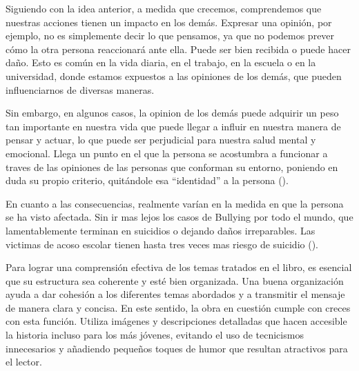 \documentclass[letterpaper, 12pt]{report}
\begin{document}
Siguiendo con la idea anterior, a medida que crecemos, comprendemos que
nuestras acciones tienen un impacto en los demás. Expresar una opinión,
por ejemplo, no es simplemente decir lo que pensamos, ya que no podemos
prever cómo la otra persona reaccionará ante ella. Puede ser bien recibida o
puede hacer daño. Esto es común en la vida diaria, en el trabajo, en la escuela
o en la universidad, donde estamos expuestos a las opiniones de los demás,
que pueden influenciarnos de diversas maneras.

Sin embargo, en algunos casos, la opinion de los demás puede adquirir un peso
tan importante en nuestra vida que puede llegar a influir en nuestra manera
de pensar y actuar, lo que puede ser perjudicial para nuestra salud mental y
emocional. Llega un punto en el que la persona se acostumbra a funcionar a
traves de las opiniones de las personas que conforman su entorno, poniendo en
duda su propio criterio, quitándole esa ``identidad'' a la
persona (\cite{Psicología}).

En cuanto a las consecuencias, realmente varían en la medida en que la persona
se ha visto afectada. Sin ir mas lejos los casos de Bullying por todo el mundo,
que lamentablemente terminan en suicidios o dejando daños irreparables. Las
victimas de acoso escolar tienen hasta tres veces mas riesgo de
suicidio (\cite{AcosoEscolar}).

Para lograr una comprensión efectiva de los temas tratados en el libro, es
esencial que su estructura sea coherente y esté bien organizada. Una buena
organización ayuda a dar cohesión a los diferentes temas abordados y a
transmitir el mensaje de manera clara y concisa. En este sentido, la obra
en cuestión cumple con creces con esta función. Utiliza imágenes y
descripciones detalladas que hacen accesible la historia incluso para
los más jóvenes, evitando el uso de tecnicismos innecesarios y añadiendo
pequeños toques de humor que resultan atractivos para el lector.






\newpage

\printbibliography
\end{document}
